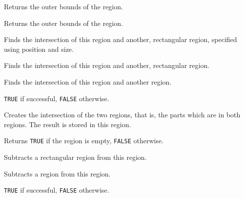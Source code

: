 \label{wxregiongetbox}


Returns the outer bounds of the region.


Returns the outer bounds of the region.

\label{wxregionintersect}


Finds the intersection of this region and another, rectangular region, specified using position and size.


Finds the intersection of this region and another, rectangular region.


Finds the intersection of this region and another region.


{\tt TRUE} if successful, {\tt FALSE} otherwise.


Creates the intersection of the two regions, that is, the parts which are in both regions. The result
is stored in this region.

\label{wxregionisempty}


Returns {\tt TRUE} if the region is empty, {\tt FALSE} otherwise.

\label{wxregionsubstract}


Subtracts a rectangular region from this region.


Subtracts a region from this region.


{\tt TRUE} if successful, {\tt FALSE} otherwise.


